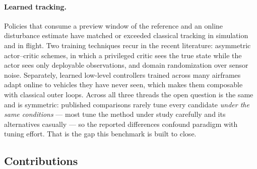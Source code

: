 \paragraph{Learned tracking.}
Policies that consume a preview window of the reference and an online disturbance
estimate\cite{huang2023datt} have matched or exceeded classical tracking in simulation
and in flight. Two training techniques recur in the recent literature: asymmetric
actor--critic schemes\cite{pinto2018asymmetric}, in which a privileged critic sees the
true state while the actor sees only deployable observations, and domain randomization
over sensor noise. Separately, learned low-level controllers trained across many
airframes\cite{zhang2025xadapt} adapt online to vehicles they have never seen, which
makes them composable with classical outer loops. Across all three threads the open
question is the same and is symmetric: published comparisons rarely tune every candidate
\emph{under the same conditions} --- most tune the method under study carefully and its
alternatives casually --- so the reported differences confound paradigm with tuning
effort. That is the gap this benchmark is built to close.

\subsection{Contributions}

